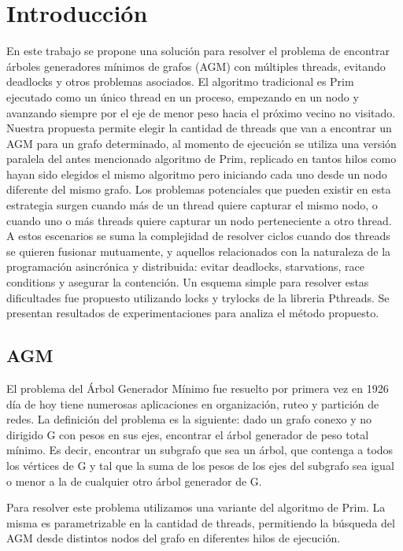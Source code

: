 \section{Introducción}

En este trabajo se propone una solución para resolver el problema de encontrar árboles generadores mínimos de grafos (AGM) con múltiples threads, evitando deadlocks y otros problemas asociados. El algoritmo tradicional es Prim ejecutado como un único thread en un proceso, empezando en un nodo y avanzando siempre por el eje de menor peso hacia el próximo vecino no visitado. Nuestra propuesta permite elegir la cantidad de threads que van a encontrar un AGM para un grafo determinado, al momento de ejecución se utiliza una versión paralela del antes mencionado algoritmo de Prim, replicado en tantos hilos como hayan sido elegidos el mismo algoritmo pero iniciando cada uno desde un nodo diferente del mismo grafo. Los problemas potenciales que pueden existir en esta estrategia surgen cuando más de un thread quiere capturar el mismo nodo, o cuando uno o más threads quiere capturar un nodo perteneciente a otro thread. A estos escenarios se suma la complejidad de resolver ciclos cuando dos threads se quieren fusionar mutuamente, y aquellos relacionados con la naturaleza de la programación asincrónica y distribuida: evitar deadlocks, starvations, race conditions y asegurar la contención. Un esquema simple para resolver estas dificultades fue propuesto utilizando locks y trylocks de la libreria Pthreads. Se presentan resultados de experimentaciones para analiza el método propuesto.

\subsection{AGM}

El problema del Árbol Generador Mínimo fue resuelto por primera vez en 1926 día de hoy tiene numerosas aplicaciones en organización, ruteo y partición de redes. La definición del problema es la siguiente: dado un grafo conexo y no dirigido G con pesos en sus ejes, encontrar el árbol generador de peso total mínimo. Es decir, encontrar un subgrafo que sea un árbol, que contenga a todos los vértices de G y tal que la suma de los pesos de los ejes del subgrafo sea igual o menor a la de cualquier otro árbol generador de G.

Para resolver este problema utilizamos una variante del algoritmo de Prim. La misma es parametrizable en la cantidad de threads, permitiendo la búsqueda del AGM desde distintos nodos del grafo en diferentes hilos de ejecución.

